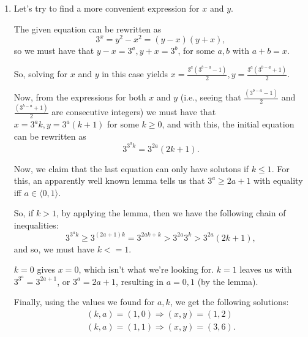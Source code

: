 \documentclass{article}
\begin{document}
\begin{enumerate}
\item Let's try to find a more convenient expression for $x$ and $y$.

The given equation can be rewritten as
$$
	3^x = y^2 - x^2 = (y - x)(y + x),
$$
so we must have that $ y - x = 3^a, y + x = 3^b$, for some $a, b$ with
$a + b = x.$

So, solving for $x$ and $y$ in this case yields
$x = \frac{3^a(3^{b - a} - 1)}{2}, y = \frac{3^a(3^{b - a} + 1)}{2}.$

Now, from the expressions for both $x$ and $y$ (i.e., seeing that
$\frac{(3^{b - a} - 1)}{2}$ and $\frac{(3^{b - a} + 1)}{2}$ are consecutive
integers) we must have that $x = 3^ak,y = 3^a(k + 1)$ for some $k \geq 0$, and
with this, the initial equation can be rewritten as
$$
	3^{3^ak} = 3^{2a}(2k + 1).
$$

Now, we claim that the last equation can only have solutons if $k \leq 1.$
For this, an apparently well known lemma tells us that $3^a \geq 2a + 1$ with
equality iff $a \in \langle 0, 1 \rangle$.

So, if $k > 1$, by applying the lemma, then we have the following chain
of inequalities:
$$
	3^{3^ak} \geq 3^{(2a + 1)k} = 3^{2ak + k} > 3^{2a} 3^k > 3^{2a}(2k + 1),
$$
and so, we must have $k <= 1.$ 

$k = 0$ gives $x = 0$, which isn't what we're looking for. $k = 1$ leaves us
with $3^{3^a} = 3^{2a + 1}$, or $3^a = 2a + 1$, resulting in $a = 0, 1$
(by the lemma).

Finally, using the values we found for $a, k$, we get the following solutions:
\begin{eqnarray*}
   (k, a) = (1, 0) \Rightarrow (x, y) = (1, 2)  \\
   (k, a) = (1, 1) \Rightarrow (x, y) = (3, 6). \\
\end{eqnarray*}

\end{enumerate}
\end{document}
